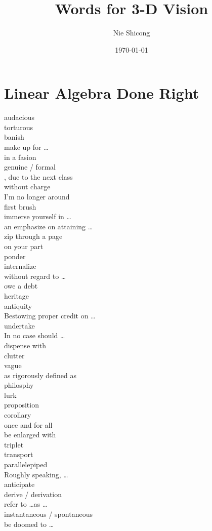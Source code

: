 \documentclass[12pt]{article}
\title{Words for 3-D Vision}
\author{Nie Shicong}
\date{\today}
\begin{document}
\begin{titlepage}
    \maketitle
\end{titlepage}

\tableofcontents

\section*{Linear Algebra Done Right}
audacious \\
torturous \\
banish \\
make up for \dots \\
in a fasion \\
genuine / formal \\
, due to the next class \\
without charge \\
I'm no longer around \\
first brush \\
immerse yourself in \dots \\
an emphasize on attaining \dots \\
zip through a page \\
on your part \\
ponder  \\
internalize \\
without regard to \dots \\
owe a debt \\
heritage \\
antiquity \\
Bestowing proper credit on \dots \\
undertake \\
In no case should \dots \\
dispense with \\
clutter  \\
vague \\
as rigorously defined as  \\
philosphy \\
lurk \\
proposition \\
corollary \\
once and for all \\
be enlarged with \\
triplet \\
transport \\
parallelepiped \\
Roughly speaking, \dots \\
anticipate  \\
derive / derivation  \\
refer to \dots as \dots \\
instantaneous / spontaneous  \\
be doomed to \dots \\
\end{document}
